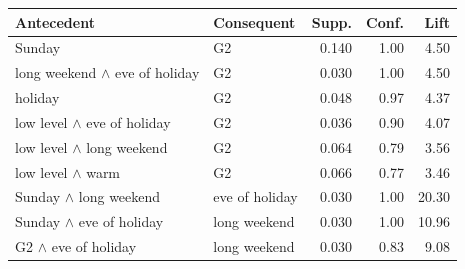\begin{tabular}{@{}llrrr@{}}
\toprule
Antecedent & Consequent & Supp. & Conf. & Lift \\
\midrule
Sunday & G2 & 0.140 & 1.00 & 4.50 \\
long weekend $\wedge$ eve of holiday & G2 & 0.030 & 1.00 & 4.50 \\
holiday & G2 & 0.048 & 0.97 & 4.37 \\
low level $\wedge$ eve of holiday & G2 & 0.036 & 0.90 & 4.07 \\
low level $\wedge$ long weekend & G2 & 0.064 & 0.79 & 3.56 \\
low level $\wedge$ warm & G2 & 0.066 & 0.77 & 3.46 \\
Sunday $\wedge$ long weekend & eve of holiday & 0.030 & 1.00 & 20.30 \\
Sunday $\wedge$ eve of holiday & long weekend & 0.030 & 1.00 & 10.96 \\
G2 $\wedge$ eve of holiday & long weekend & 0.030 & 0.83 & 9.08 \\
\bottomrule
\end{tabular}
